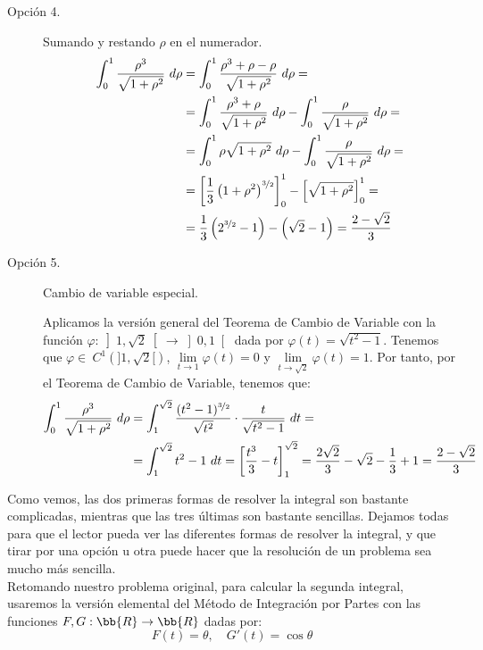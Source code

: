 \begin{ejercicio}
\begin{description}
        \item [Opción 4.] Sumando y restando $\rho$ en el numerador.
        \begin{align*}
            \int_0^1 \dfrac{\rho^3}{\sqrt{1+\rho^2}} ~d\rho &= \int_0^1 \dfrac{\rho^3+\rho-\rho}{\sqrt{1+\rho^2}} ~d\rho =\\
            &= \int_0^1 \dfrac{\rho^3+\rho}{\sqrt{1+\rho^2}} ~d\rho - \int_0^1 \dfrac{\rho}{\sqrt{1+\rho^2}} ~d\rho =\\
            &= \int_0^1 \rho\sqrt{1+\rho^2} ~d\rho - \int_0^1 \dfrac{\rho}{\sqrt{1+\rho^2}} ~d\rho =\\
            &= \left[\dfrac{1}{3}\left(1+\rho^2\right)^{\nicefrac{3}{2}}\right]_0^1 - \left[\sqrt{1+\rho^2}\right]_0^1 =\\
            &= \dfrac{1}{3}\left(2^{\nicefrac{3}{2}}-1\right) - \left(\sqrt{2}-1\right) = \dfrac{2-\sqrt{2}}{3}
        \end{align*}

        \item [Opción 5.] Cambio de variable especial.
        
        Aplicamos la versión general del Teorema de Cambio de Variable con la función $\varphi:\left]1,\sqrt{2}\right[\to \left]0,1\right[$ dada por $\varphi(t)=\sqrt{t^2-1}$.
        Tenemos que $\varphi\in~C^1\left(]1,\sqrt{2}[\right)$, $\lim\limits_{t\to 1}\varphi(t)=0$ y $\lim\limits_{t\to \sqrt{2}}\varphi(t)=1$. Por tanto, por el Teorema de Cambio de Variable, tenemos que:
        \begin{align*}
            \int_0^1 \dfrac{\rho^3}{\sqrt{1+\rho^2}} ~d\rho &= \int_1^{\sqrt{2}} \dfrac{(t^2-1)^{\nicefrac{3}{2}}}{\sqrt{t^2}}\cdot \dfrac{t}{\sqrt{t^2-1}}~dt =\\
            &= \int_1^{\sqrt{2}} t^2-1 ~dt
            = \left[\dfrac{t^3}{3}-t\right]_1^{\sqrt{2}} = \dfrac{2\sqrt{2}}{3}-\sqrt{2}-\dfrac{1}{3}+1 = \dfrac{2-\sqrt{2}}{3}
        \end{align*}
    \end{description}
    Como vemos, las dos primeras formas de resolver la integral son bastante complicadas, mientras que las tres últimas son bastante sencillas. Dejamos todas para que el lector pueda ver las diferentes formas de resolver la integral, y que tirar por una opción u otra puede hacer que la resolución de un problema sea mucho más sencilla.\\

    Retomando nuestro problema original, para calcular la segunda integral, usaremos la versión elemental del Método de Integración por Partes con las funciones $F,G:\bb{R}\to \bb{R}$ dadas por:
    \begin{equation*}
        F(t) = \theta, \quad G'(t) = \cos\theta
    \end{equation*}


\end{ejercicio}
